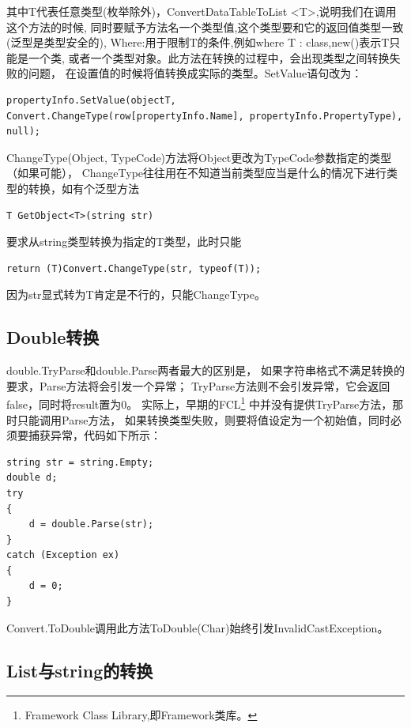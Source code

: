 \documentclass{book}
\begin{document}
其中T代表任意类型(枚举除外)，ConvertDataTableToList <T>,说明我们在调用这个方法的时候,
同时要赋予方法名一个类型值,这个类型要和它的返回值类型一致(泛型是类型安全的),
Where:用于限制T的条件,例如where T : class,new()表示T只能是一个类,
或者一个类型对象。此方法在转换的过程中，会出现类型之间转换失败的问题，
在设置值的时候将值转换成实际的类型。SetValue语句改为：

\begin{lstlisting}[language={[Sharp]C}]
propertyInfo.SetValue(objectT, Convert.ChangeType(row[propertyInfo.Name], propertyInfo.PropertyType), null);
\end{lstlisting}

ChangeType(Object, TypeCode)方法将Object更改为TypeCode参数指定的类型（如果可能），
ChangeType往往用在不知道当前类型应当是什么的情况下进行类型的转换，如有个泛型方法

\begin{lstlisting}[language={[Sharp]C}]
T GetObject<T>(string str)
\end{lstlisting}

要求从string类型转换为指定的T类型，此时只能

\begin{lstlisting}[language={[Sharp]C}]
return (T)Convert.ChangeType(str, typeof(T));
\end{lstlisting}

因为str显式转为T肯定是不行的，只能ChangeType。

\subsection{Double转换}

double.TryParse和double.Parse两者最大的区别是，
如果字符串格式不满足转换的要求，Parse方法将会引发一个异常；
TryParse方法则不会引发异常，它会返回false，同时将result置为0。
实际上，早期的FCL\footnote{Framework Class Library,即Framework类库。}
中并没有提供TryParse方法，那时只能调用Parse方法，
如果转换类型失败，则要将值设定为一个初始值，同时必须要捕获异常，代码如下所示：

\begin{lstlisting}[language={[Sharp]C}]
string str = string.Empty;  
double d;  
try  
{  
    d = double.Parse(str);  
}  
catch (Exception ex)  
{  
    d = 0;  
}
\end{lstlisting}

Convert.ToDouble调用此方法ToDouble(Char)始终引发InvalidCastException。

\subsection{List与string的转换}
\end{document}
